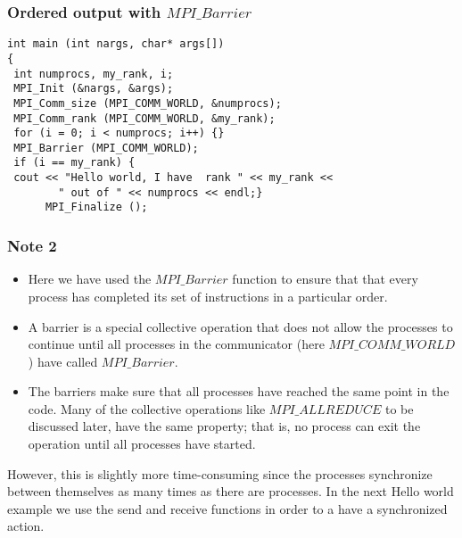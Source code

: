 \documentclass{beamer}
\begin{document}
\begin{frame}
\frametitle{Ordered output with $MPI\_Barrier$}

\begin{block}{}

\begin{verbatim}
int main (int nargs, char* args[])
{
 int numprocs, my_rank, i;
 MPI_Init (&nargs, &args);
 MPI_Comm_size (MPI_COMM_WORLD, &numprocs);
 MPI_Comm_rank (MPI_COMM_WORLD, &my_rank);
 for (i = 0; i < numprocs; i++) {}
 MPI_Barrier (MPI_COMM_WORLD);
 if (i == my_rank) {
 cout << "Hello world, I have  rank " << my_rank << 
        " out of " << numprocs << endl;}
      MPI_Finalize ();
\end{verbatim}

\end{block}
\end{frame}

\begin{frame}
\frametitle{Note 2}

\begin{block}{}
\begin{itemize}
\item Here we have used the $MPI\_Barrier$ function to ensure that that every process has completed  its set of instructions in  a particular order.

\item A barrier is a special collective operation that does not allow the processes to continue until all processes in the communicator (here $MPI\_COMM\_WORLD$) have called $MPI\_Barrier$. 

\item The barriers make sure that all processes have reached the same point in the code. Many of the collective operations like $MPI\_ALLREDUCE$ to be discussed later, have the same property; that is, no process can exit the operation until all processes have started. 
\end{itemize}

\noindent
However, this is slightly more time-consuming since the processes synchronize between themselves as many times as there
are processes.  In the next Hello world example we use the send and receive functions in order to a have a synchronized
action.


\end{block}
\end{frame}
\end{document}
